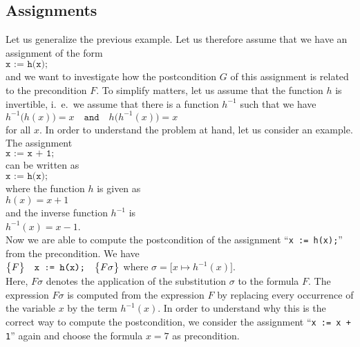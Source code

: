 \subsection{Assignments}
Let us generalize the previous example.  Let us therefore assume that we have an assignment of the
form 
\\[0.2cm]
\hspace*{1.3cm}
$ \texttt{x := h(x);} $
\\[0.2cm]
and we want to investigate how the postcondition $G$ of this assignment is related to the
precondition $F$.  To simplify matters, let us assume that the function
$h$ is invertible, i.~e.~we assume that there is a function $h^{-1}$ such that we have
\\[0.2cm]
\hspace*{1.3cm}
$ h^{-1}\bigl(h(x)\bigr) = x \quad \mathtt{and} \quad h\bigl(h^{-1}(x)\bigr) = x $
\\[0.2cm]
for all $x$.  In order to understand the problem at hand, let us consider an example.
The assignment
\\[0.2cm]
\hspace*{1.3cm}
$ \texttt{x := x + 1;} $
\\[0.2cm]
can be written as
\\[0.2cm]
\hspace*{1.3cm}
$ \texttt{x := h(x);} $
\\[0.2cm]
where the function $h$ is given as
\\[0.2cm]
\hspace*{1.3cm}
$ h(x) = x + 1 $
\\[0.2cm]
and the inverse function $h^{-1}$ is 
\\[0.2cm]
\hspace*{1.3cm}
$h^{-1}(x) = x - 1$. 
\\[0.2cm]
Now we are able to compute the postcondition of the assignment ``\texttt{x := h(x);}'' from the
precondition.  We have
\\[0.2cm]
\hspace*{1.3cm}
$\bigl\{F\bigr\}\quad\texttt{x := h(x);}\quad\bigl\{F\sigma\bigr\}$ \quad where \quad 
$\sigma = \bigl[x \mapsto h^{-1}(x)\bigr]$.
\\[0.2cm]
Here, $F\sigma$ denotes the application of the substitution $\sigma$ to the formula $F$.  The
expression  $F\sigma$ is computed from the expression $F$ by replacing every occurrence of the variable
$x$ by the term $h^{-1}(x)$.  In order to understand why this is the correct way to compute the 
postcondition, we consider the assignment
``\texttt{x := x + 1}'' again and choose the formula $x = 7$ as precondition.  
